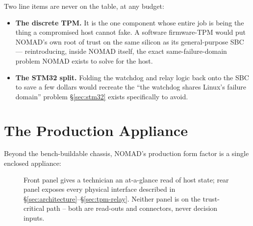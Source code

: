 \documentclass[11pt,a4paper]{article}
\newcommand{\figcap}[1]{\caption{#1}}
\begin{document}
\begin{notebox}
Two line items are never on the table, at any budget:

\begin{itemize}
  \item \textbf{The discrete TPM.} It is the one component whose entire
    job is being the thing a compromised host cannot fake. A software
    firmware-TPM would put NOMAD's own root of trust on the same silicon
    as its general-purpose SBC --- reintroducing, inside NOMAD itself,
    the exact same-failure-domain problem NOMAD exists to solve for the
    host.
  \item \textbf{The STM32 split.} Folding the watchdog and relay logic
    back onto the SBC to save a few dollars would recreate the ``the
    watchdog shares Linux's failure domain'' problem \S\ref{sec:stm32}
    exists specifically to avoid.
\end{itemize}
\end{notebox}

\section{The Production Appliance}
\label{sec:appliance-final}

Beyond the bench-buildable chassis, NOMAD's production form factor is a
single enclosed appliance:

\begin{figure}[h!]
\centering
{}
\figcap{Front panel gives a technician an at-a-glance read of host state; rear panel exposes every physical interface described in \S\ref{sec:architecture}--\S\ref{sec:tpm-relay}. Neither panel is on the trust-critical path -- both are read-outs and connectors, never decision inputs.}
\label{fig:appliance}
\end{figure}
\end{document}
